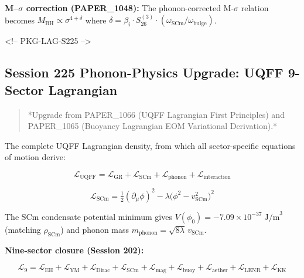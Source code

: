 \documentclass[12pt,a4paper]{article}
\begin{document}
\textbf{M--$\sigma$ correction (PAPER\_1048):} The phonon-corrected M-$\sigma$ relation becomes $M_{\text{BH}} \propto \sigma^{4+\delta}$ where $\delta = \beta_i \cdot S_{26}^{(3)} \cdot (\omega_{\text{SCm}}/\omega_{\text{bulge}})$.

<!-- PKG-LAG-S225 -->

\subsection{Session 225 Phonon-Physics Upgrade: UQFF 9-Sector Lagrangian}

\begin{quote}
*Upgrade from PAPER\_1066 (UQFF Lagrangian First Principles) and
PAPER\_1065 (Buoyancy Lagrangian EOM Variational Derivation).*
\end{quote}

The complete UQFF Lagrangian density, from which all sector-specific equations of motion derive:

\begin{equation}
\mathcal{L}_{\text{UQFF}} = \mathcal{L}_{\text{GR}} + \mathcal{L}_{\text{SCm}} + \mathcal{L}_{\text{phonon}} + \mathcal{L}_{\text{interaction}}
\end{equation}

\begin{equation}
\mathcal{L}_{\text{SCm}} = \tfrac{1}{2}(\partial_\mu \phi)^2 - \lambda\bigl(\phi^2 - v_{\text{SCm}}^2\bigr)^2
\end{equation}

The SCm condensate potential minimum gives $V(\phi_0) = -7.09 \times 10^{-37}\;\text{J/m}^3$ (matching $\rho_{\text{SCm}}$) and phonon mass $m_{\text{phonon}} = \sqrt{8\lambda}\,v_{\text{SCm}}$.

\textbf{Nine-sector closure (Session 202):}

\begin{equation}
\mathcal{L}_{9} = \mathcal{L}_{\text{EH}} + \mathcal{L}_{\text{YM}} + \mathcal{L}_{\text{Dirac}} + \mathcal{L}_{\text{SCm}} + \mathcal{L}_{\text{mag}} + \mathcal{L}_{\text{buoy}} + \mathcal{L}_{\text{aether}} + \mathcal{L}_{\text{LENR}} + \mathcal{L}_{\text{KK}}
\end{equation}
\end{document}
